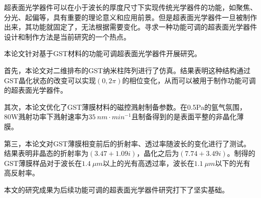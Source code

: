 \begin{cabstract}
超表面光学器件可以在小于波长的厚度尺寸下实现传统光学器件的功能，如聚焦、分光、起偏等，具有重要的理论意义和应用前景。但是超表面光学器件一旦被制作出来，其功能就固定了，无法根据需要变化。寻求一种功能可调的超表面光学器件设计和制作方法是当前研究的一个热点。

本论文针对基于GST材料的功能可调超表面光学器件开展研究。

首先，本论文对二维排布的GST纳米柱阵列进行了仿真。结果表明这种结构通过GST晶化状态的改变可以实现$\left ( 0, 2\pi \right )$的相位变化，从而可以被用于制作功能可调的超表面光学器件。

其次，本论文优化了GST薄膜材料的磁控溅射制备参数。在0.5Pa的氩气氛围，80W溅射功率下溅射速率为$35\ nm \cdot{} min^{-1}$且制备得到的是表面平整的非晶化薄膜。

第三，本论文对GST薄膜相变前后的折射率、透过率随波长的变化进行了测试。结果表明非晶态的折射率为$\left ( 3.47 + 1.09i \right )$，晶化之后为$\left ( 7.74 + 3.49i \right )$。制得的GST薄膜样品对于波长在$1.4\ \mu m$以上的光有高透过率，波长在$1.1\ \mu m$以下的光有高反射率。

本文的研究成果为后续功能可调的超表面光学器件研究打下了坚实基础。
\end{cabstract}


